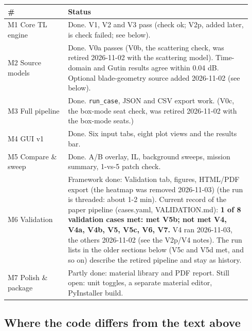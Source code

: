 \documentclass[10pt,a4paper]{article}
\begin{document}
{\small
\begin{longtable}{>{\raggedright\arraybackslash}p{0.232\linewidth}>{\raggedright\arraybackslash}p{0.708\linewidth}}
\hline
\textbf{\#} & \textbf{Status} \\
\hline
\endhead
M1 Core TL engine & Done. V1, V2 and V3 pass (check ok; V2p, added later, is check failed; see below). \\
M2 Source models & Done. V0a passes (V0b, the scattering check, was retired 2026-11-02 with the scattering model). Time-domain and Gutin results agree within 0.04 dB. Optional blade-geometry source added 2026-11-02 (see below). \\
M3 Full pipeline & Done. \texttt{run\_\allowbreak{}case}, JSON and CSV export work. (V0c, the box-mode seat check, was retired 2026-11-02 with the box-mode seats.) \\
M4 GUI v1 & Done. Six input tabs, eight plot views and the results bar. \\
M5 Compare \& sweep & Done. A/B overlay, IL, background sweeps, mission summary, 1-vs-5 patch check. \\
M6 Validation & Framework done: Validation tab, figures, HTML/PDF export (the heatmap was removed 2026-11-03) (the run is threaded: about 1-2 min). Current record of the paper pipeline (cases.yaml, VALIDATION.md): \textbf{1 of 8 validation cases met: met V5b; not met V4, V4a, V4b, V5, V5c, V6, V7.} V4 ran 2026-11-03, the others 2026-11-02 (see the V2p/V4 notes). The run lists in the older sections below (V5c and V5d met, and so on) describe the retired pipeline and stay as history. \\
M7 Polish \& package & Partly done: material library and PDF report. Still open: unit toggles, a separate material editor, PyInstaller build. \\
\hline
\end{longtable}}

\subsection*{Where the code differs from the text above}
\end{document}
